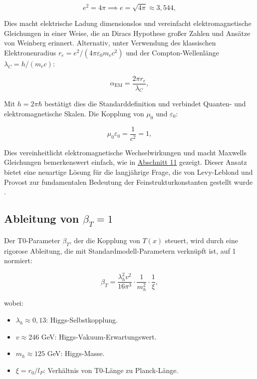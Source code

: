 \documentclass[twocolumn,aps,prl]{revtex4-2}
\begin{document}
	\begin{equation}
		e^2 = 4 \pi \implies e = \sqrt{4 \pi} \approx 3,544, \label{eq:charge_value}
	\end{equation}
	
	Dies macht elektrische Ladung dimensionslos und vereinfacht elektromagnetische Gleichungen in einer Weise, die an Diracs Hypothese großer Zahlen \cite{Dirac1937} und Ansätze von Weinberg \cite{Weinberg1983} erinnert. Alternativ, unter Verwendung des klassischen Elektronenradius $r_e = e^2/(4 \pi \varepsilon_0 m_e c^2)$ und der Compton-Wellenlänge $\lambda_C = h/(m_e c)$:
	
	\begin{equation}
		\alpha_{\text{EM}} = \frac{2 \pi r_e}{\lambda_C}, \label{eq:alpha_alt}
	\end{equation}
	
	Mit $h = 2 \pi \hbar$ bestätigt dies die Standarddefinition und verbindet Quanten- und elektromagnetische Skalen. Die Kopplung von $\mu_0$ und $\varepsilon_0$:
	
	\begin{equation}
		\mu_0 \varepsilon_0 = \frac{1}{c^2} = 1, \label{eq:em_coupling}
	\end{equation}
	
	Dies vereinheitlicht elektromagnetische Wechselwirkungen und macht Maxwells Gleichungen bemerkenswert einfach, wie in \hyperref[subsec:detailed_em_constants]{Abschnitt 11} gezeigt. Dieser Ansatz bietet eine neuartige Lösung für die langjährige Frage, die von Levy-Leblond und Provost zur fundamentalen Bedeutung der Feinstrukturkonstanten gestellt wurde \cite{LevyLeblond1979}.
	
	\subsection{Ableitung von $\beta_T = 1$}
	\label{subsec:beta_derivation}
	
	Der T0-Parameter $\beta_T$, der die Kopplung von $T(x)$ steuert, wird durch eine rigorose Ableitung, die mit Standardmodell-Parametern verknüpft ist, auf 1 normiert:
	
	\begin{equation}
		\beta_T = \frac{\lambda_h^2 v^2}{16 \pi^3} \cdot \frac{1}{m_h^2} \cdot \frac{1}{\xi}, \label{eq:beta_derivation}
	\end{equation}
	
	wobei:
	\begin{itemize}
		\item $\lambda_h \approx 0,13$: Higgs-Selbstkopplung.
		\item $v \approx 246$ GeV: Higgs-Vakuum-Erwartungswert.
		\item $m_h \approx 125$ GeV: Higgs-Masse.
		\item $\xi = r_0/l_P$: Verhältnis von T0-Länge zu Planck-Länge.
	\end{itemize}
	
\end{document}
